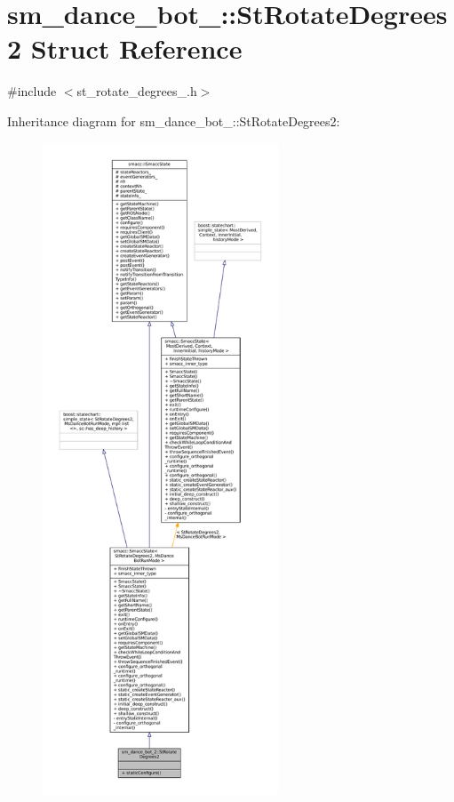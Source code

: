 \hypertarget{structsm__dance__bot__2_1_1StRotateDegrees2}{}\section{sm\+\_\+dance\+\_\+bot\+\_\+:\+:St\+Rotate\+Degrees2 Struct Reference}
\label{structsm__dance__bot__2_1_1StRotateDegrees2}


{\ttfamily \#include $<$st\+\_\+rotate\+\_\+degrees\+\_.\+h$>$}



Inheritance diagram for sm\+\_\+dance\+\_\+bot\+\_\+:\+:St\+Rotate\+Degrees2\+:
\nopagebreak
\begin{figure}[H]
\begin{center}
\leavevmode
\includegraphics[height=550pt]{structsm__dance__bot__2_1_1StRotateDegrees2__inherit__graph}
\end{center}
\end{figure}


